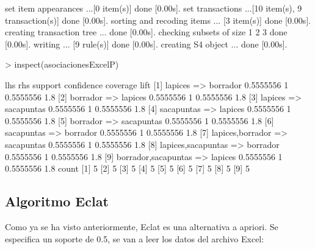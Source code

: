 \documentclass [a4paper] {article}
\begin{document}
\begin{Schunk}
\begin{Soutput}
set item appearances ...[0 item(s)] done [0.00s].
set transactions ...[10 item(s), 9 transaction(s)] done [0.00s].
sorting and recoding items ... [3 item(s)] done [0.00s].
creating transaction tree ... done [0.00s].
checking subsets of size 1 2 3 done [0.00s].
writing ... [9 rule(s)] done [0.00s].
creating S4 object  ... done [0.00s].
\end{Soutput}
\begin{Sinput}
> inspect(asociacionesExcelP)
\end{Sinput}
\begin{Soutput}
    lhs                      rhs          support   confidence coverage  lift
[1] {lapices}             => {borrador}   0.5555556 1          0.5555556 1.8 
[2] {borrador}            => {lapices}    0.5555556 1          0.5555556 1.8 
[3] {lapices}             => {sacapuntas} 0.5555556 1          0.5555556 1.8 
[4] {sacapuntas}          => {lapices}    0.5555556 1          0.5555556 1.8 
[5] {borrador}            => {sacapuntas} 0.5555556 1          0.5555556 1.8 
[6] {sacapuntas}          => {borrador}   0.5555556 1          0.5555556 1.8 
[7] {lapices,borrador}    => {sacapuntas} 0.5555556 1          0.5555556 1.8 
[8] {lapices,sacapuntas}  => {borrador}   0.5555556 1          0.5555556 1.8 
[9] {borrador,sacapuntas} => {lapices}    0.5555556 1          0.5555556 1.8 
    count
[1] 5    
[2] 5    
[3] 5    
[4] 5    
[5] 5    
[6] 5    
[7] 5    
[8] 5    
[9] 5    
\end{Soutput}
\end{Schunk}

\subsection{Algoritmo Eclat}

Como ya se ha visto anteriormente, Eclat es una alternativa a apriori.
Se especifica un soporte de 0.5, se van a leer los datos del archivo Excel:
\end{document}
